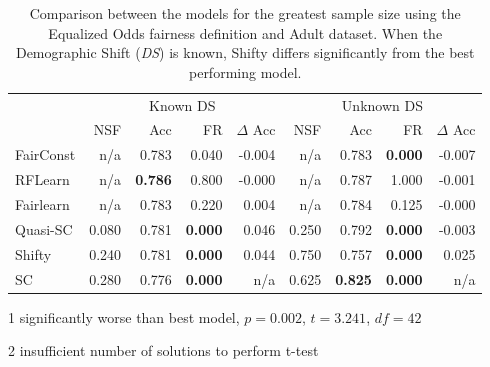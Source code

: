 \begin{table}[H]
\begin{threeparttable}
\centering
\begin{tabular}{lrrrrrrrr}
\toprule
 & \multicolumn{4}{c}{Known DS} & \multicolumn{4}{c}{Unknown DS} \\
 & NSF & Acc & FR & $\Delta$ Acc & NSF & Acc & FR & $\Delta$ Acc \\
\cmidrule(r){2-5} \cmidrule{6-9}
FairConst & n/a & 0.783 & 0.040 & -0.004 & n/a & 0.783 & \bfseries 0.000 & -0.007 \\
RFLearn & n/a & \bfseries 0.786 & 0.800 & -0.000 & n/a & 0.787 & 1.000 & -0.001 \\
Fairlearn & n/a & 0.783 & 0.220 & 0.004 & n/a & 0.784 & 0.125 & -0.000 \\
Quasi-SC & 0.080 & 0.781 & \bfseries 0.000 & 0.046 & 0.250 & 0.792 & \bfseries 0.000 & -0.003 \\
Shifty & 0.240 & 0.781\tnote{1} & \bfseries 0.000 & 0.044 & 0.750 & 0.757\tnote{2} & \bfseries 0.000 & 0.025 \\
SC & 0.280 & 0.776 & \bfseries 0.000 & n/a & 0.625 & \bfseries 0.825 & \bfseries 0.000 & n/a \\
\bottomrule
\end{tabular}
\begin{tablenotes}
\item[1] significantly worse than best model, $p=0.002$, $t=3.241$, $df=42$
\item[2] insufficient number of solutions to perform t-test
\end{tablenotes}
\end{threeparttable}
\caption{Comparison between the models for the greatest sample size using the Equalized Odds fairness definition and Adult dataset. When the Demographic Shift (\textit{DS}) is known, Shifty differs significantly from the best performing model.}
\label{eodds_adult}
\end{table}
